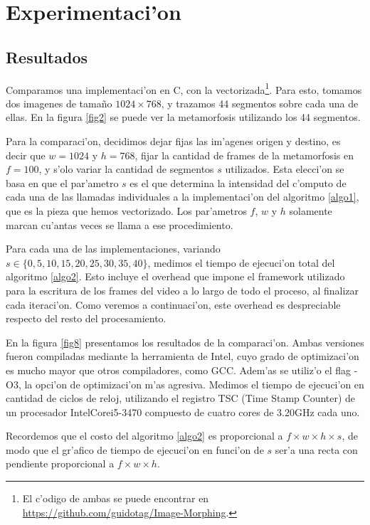 \section{Experimentaci'on}

\subsection{Resultados}

Comparamos una implementaci'on en C, con la vectorizada\footnote{El c'odigo de ambas se puede encontrar en \url{https://github.com/guidotag/Image-Morphing}.}. Para esto, tomamos dos imagenes de tama\~{n}o $1024 \times 768$, y trazamos 44 segmentos sobre cada una de ellas. En la figura \ref{fig2} se puede ver la metamorfosis utilizando los 44 segmentos.

Para la comparaci'on, decidimos dejar fijas las im'agenes origen y destino, es decir que $w = 1024$ y $h = 768$, fijar la cantidad de frames de la metamorfosis en $f = 100$, y s'olo variar la cantidad de segmentos $s$ utilizados. Esta elecci'on se basa en que el par'ametro $s$ es el que determina la intensidad del c'omputo de cada una de las llamadas individuales a la implementaci'on del algoritmo \ref{algo1}, que es la pieza que hemos vectorizado. Los par'ametros $f$, $w$ y $h$ solamente marcan cu'antas veces se llama a ese procedimiento.

Para cada una de las implementaciones, variando $s \in \{0, 5, 10, 15, 20, 25, 30, 35, 40\}$, medimos el tiempo de ejecuci'on total del algoritmo \ref{algo2}. Esto incluye el overhead que impone el framework utilizado para la escritura de los frames del video a lo largo de todo el proceso, al finalizar cada iteraci'on. Como veremos a continuaci'on, este overhead es despreciable respecto del resto del procesamiento.

En la figura \ref{fig8} presentamos los resultados de la comparaci'on. Ambas versiones fueron compiladas mediante la herramienta de Intel, cuyo grado de optimizaci'on es mucho mayor que otros compiladores, como GCC. Adem'as se utiliz'o el flag -O3, la opci'on de optimizaci'on m'as agresiva. Medimos el tiempo de ejecuci'on en cantidad de ciclos de reloj, utilizando el registro TSC (Time Stamp Counter) de un procesador Intel\textregistered Core\texttrademark i5-3470 compuesto de cuatro cores de 3.20GHz cada uno.

Recordemos que el costo del algoritmo \ref{algo2} es proporcional a $f \times w \times h \times s$, de modo que el gr'afico de tiempo de ejecuci'on en funci'on de $s$ ser'a una recta con pendiente proporcional a $f \times w \times h$.

